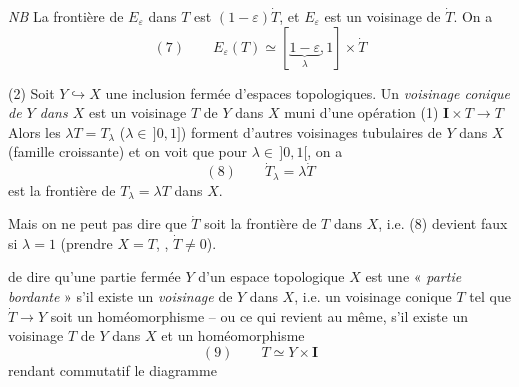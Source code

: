 \documentclass[11pt,a4paper]{article}
\begin{document}
\emph{NB} La frontière de $E_\varepsilon$ dans $T$ est $(1-\varepsilon)\dot T$, et $E_\varepsilon$ est un voisinage de $\dot T$. On a
\[
(7)\qquad E_\varepsilon(T)\simeq[\underbrace{1-\varepsilon}_{\lambda},1]\times\dot T
\]

\marginal{\emph{NB} Si \struck{$\dot T$} $Y$ (\uncertain{ou} \ill{}), les $T_\varepsilon$ ($\varepsilon\in\,]0,1]$) forment \uncertain{un} \ill{} \uncertain{de} voisinages de $Y$ dans $T$, (\struck{\ill{}}) \uncertain{\ill{}} \uncertain{tubulaires}}

(2) Soit $Y\hookrightarrow X$ une inclusion fermée d'espaces topologiques. Un \emph{voisinage conique de $Y$ dans $X$} est un voisinage $T$ de $Y$ dans $X$ muni d'une opération (1) $\mathbf{I}\times T\to T$   \struck{\ill{}}   Alors les $\lambda T=T_\lambda$ ($\lambda\in\,]0,1]$) forment d'autres voisinages tubulaires de $Y$ dans $X$ (famille croissante) et on voit que pour $\lambda\in\,]0,1[$, on a
\[
(8)\qquad \dot T_\lambda=\lambda\dot T
\]
est la frontière de $T_\lambda=\lambda T$ dans $X$.



Mais on ne peut pas dire  que $\dot T$ soit la frontière de $T$ dans $X$, i.e. (8) devient faux si $\lambda=1$ (prendre $X=T$, \uncertain{\ill{}}, $\dot T\neq0$).

   de dire qu'une partie fermée  $Y$ d'un espace topologique $X$ est une « \emph{partie bordante} » s'il existe un \emph{voisinage} \struck{\ill{}}   de $Y$ dans $X$, i.e. un voisinage  conique $T$ tel que $\dot T\to Y$ soit un homéomorphisme -- ou ce qui revient au même,  s'il existe un voisinage $T$ de $Y$ dans $X$ et un homéomorphisme
\[
(9)\qquad T\simeq Y\times\mathbf{I}
\]
rendant commutatif le diagramme
\end{document}
